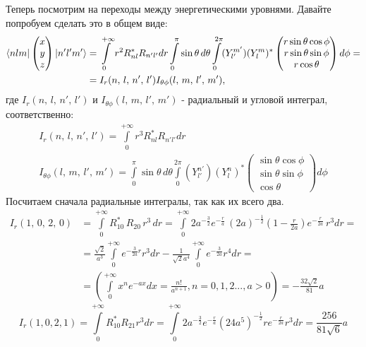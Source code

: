 Теперь посмотрим на переходы между энергетическими уровнями. Давайте попробуем сделать это в общем виде:
\begin{align*}
    \bra{nlm}\begin{pmatrix} x \\ y \\ z \end{pmatrix}\ket{n'l'm'} &= \int\limits_{0}^{+\infty} r^2 R^*_{nl} R_{n'l'} dr \int\limits_{0}^{\pi}\sin\theta\,d\theta\int\limits_{0}^{2\pi}(Y^{m'}_{l'}) (Y^m_l)^* \begin{pmatrix} r\sin\theta\cos\phi \\ r\sin\theta\sin\phi \\ r\cos\theta \end{pmatrix} d\phi = \\ & = I_r(n,\,l,\,n',\,l')I_{\theta\phi}(l,\,m,\,l',\,m'),
\end{align*}
где $I_r(n,\,l,\,n',\,l')$ и $I_{\theta\phi}(l,\,m,\,l',\,m')$ - радиальный и угловой интеграл, соответственно:
\begin{gather*}
I_r(n,\,l,\,n',\,l') = \int\limits_{0}^{+\infty} r^3 R^*_{nl} R_{n'l'} dr\\
I_{\theta\phi}(l,\,m,\,l',\,m') = \int\limits_{0}^{\pi}\sin\theta\,d\theta\int\limits_{0}^{2\pi}(Y^{n'}_{l'}) (Y^n_l)^* \begin{pmatrix} \sin\theta\cos\phi \\ \sin\theta\sin\phi \\ \cos\theta \end{pmatrix} d\phi
\end{gather*}
Посчитаем сначала радиальные интегралы, так как их всего два.
\begin{align*}
    I_r(1,\,0,\,2,\,0) &= \int\limits_{0}^{+\infty} R_{10}^*\,R_{20}\,r^3\,dr = \int\limits_{0}^{+\infty} 2a^{-\frac{3}{2}} e^{-\frac{r}{a}} \, (2a)^{-\frac{1}{2}} \left(1 - \frac{r}{2a}\right) e^{-\frac{r}{2a}} \, r^3 dr = \\
    & = \frac{\sqrt{2}}{a^3} \int\limits_{0}^{+\infty} e^{-\frac{3}{2a}r} r^3 dr - \frac{1}{\sqrt{2}a^4} \int\limits_{0}^{+\infty} e^{-\frac{3}{2a}} r^4 dr = \\
    & = \left(\int\limits_{0}^{+\infty} x^n e^{-ax} dx = \frac{n!}{a^{n + 1}}, n = 0, 1, 2..., a > 0\right) = -\frac{32\sqrt{2}}{81} a
\end{align*}
\[
    I_r(1, 0, 2, 1) = \int\limits_{0}^{+\infty} R_{10}^* R_{21} r^3 dr = \int\limits_{0}^{+\infty} 2a^{-\frac{3}{2}} e^{-\frac{r}{a}} (24a^5)^{-\frac{1}{2}} r e^{-\frac{r}{2a}} r^3 dr = \frac{256}{81\sqrt{6}} a
\]
